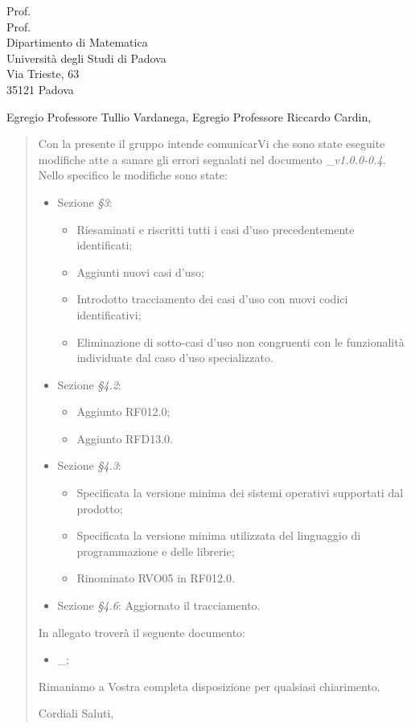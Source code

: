 \documentclass[a4paper,12pt]{letteracdp}
\date{11 febbraio 2021}
\begin{document}
\thispagestyle{empty}

\begin{letter}{
	Prof. \Tullio{} \\
	Prof. \Riccardo{} \\
	Dipartimento di Matematica \\
	Università degli Studi di Padova \\
	Via Trieste, 63 \\
	35121 Padova}
	
\opening{Egregio Professore Tullio Vardanega, \newline
Egregio Professore Riccardo Cardin,}

\begin{quotation}
	\noindent 
	Con la presente il gruppo \gruppo{} intende comunicarVi che sono state eseguite modifiche atte a sanare gli errori segnalati nel documento \docAdR{}\_\textit{v1.0.0-0.4}. \newline{}Nello specifico le modifiche sono state:
	\begin{itemize}
		\item Sezione \textit{\S{}3}:
		\begin{itemize}
			\item Riesaminati e riscritti tutti i casi d'uso precedentemente identificati;
			\item Aggiunti nuovi casi d'uso;
			\item Introdotto tracciamento dei casi d'uso con nuovi codici identificativi;
			\item Eliminazione di sotto-casi d'uso non congruenti con le funzionalità individuate dal caso d'uso specializzato.
		\end{itemize}
		\item Sezione \textit{\S{}4.2}:
		\begin{itemize}
			\item Aggiunto RF012.0;
			\item Aggiunto RFD13.0.
			
		\end{itemize}
		\item Sezione \textit{\S{}4.3}:
		\begin{itemize}
			\item Specificata la versione minima dei sistemi operativi supportati dal prodotto;
			\item Specificata la versione minima utilizzata del linguaggio di programmazione e delle librerie;
			\item Rinominato RVO05 in RF012.0.	
		\end{itemize}
		\item Sezione \textit{\S{}4.6}: Aggiornato il tracciamento.	
	\end{itemize}
In allegato troverà il seguente documento:
\begin{itemize}
		\item \docAdR{}\_\versAdR;		
	\end{itemize}
Rimaniamo a Vostra completa disposizione per qualsiasi chiarimento.

\vspace{0.5cm}
\closing{ Cordiali Saluti,}

\end{quotation}

\end{letter}
\end{document}
